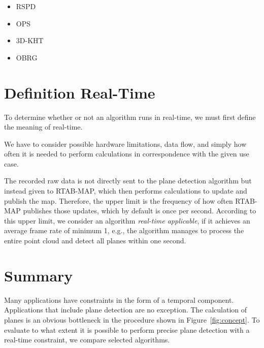 \documentclass[main.tex]{subfiles}
\begin{document}
\begin{itemize}
    \item RSPD
    \item OPS
    \item 3D-KHT
    \item OBRG
\end{itemize}


\section{Definition Real-Time}\label{sec:realtime}
To determine whether or not an algorithm runs in real-time, we must first define the meaning of real-time.

We have to consider possible hardware limitations, data flow, and simply
how often it is needed to perform calculations in correspondence with the given use case.

The recorded raw data is not directly sent to the plane detection algorithm but instead given to RTAB-MAP, which then performs
calculations to update and publish the map.
Therefore, the upper limit is the frequency of how often RTAB-MAP publishes those updates, which by default is once per second.
According to this upper limit, we consider an algorithm \textit{real-time applicable}, if it achieves an average frame
rate of minimum 1, e.g., the algorithm manages to process the entire point cloud and detect all planes within one second.


\section{Summary}
Many applications have constraints in the form of a temporal component. Applications that include plane detection
are no exception. The calculation of planes is an obvious bottleneck in the procedure shown in Figure~\ref{fig:concept}.
To evaluate to what extent it is possible to perform precise plane detection with a real-time constraint,
we compare selected algorithms.
\end{document}
